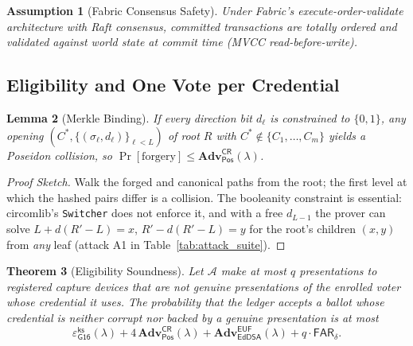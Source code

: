 \documentclass[10pt,letterpaper,journal]{IEEEtran}
\newtheorem{theorem}{Theorem}[section]
\newtheorem{lemma}[theorem]{Lemma}
\newtheorem{assumption}[theorem]{Assumption}
\begin{document}
\begin{assumption}[Fabric Consensus Safety]
\label{asm:fabric}
Under Fabric's execute-order-validate architecture with Raft consensus, committed transactions are totally ordered and validated against world state at commit time (MVCC read-before-write).
\end{assumption}

\subsection{Eligibility and One Vote per Credential}
\label{sec:eligibility}

\begin{lemma}[Merkle Binding]
\label{lem:merkle-binding}
If every direction bit $d_\ell$ is constrained to $\{0,1\}$, any opening $(C^\ast, \{(\sigma_\ell, d_\ell)\}_{\ell<L})$ of root $R$ with $C^\ast \notin \{C_1,\ldots,C_m\}$ yields a Poseidon collision, so $\Pr[\text{forgery}] \leq \mathbf{Adv}^{\mathsf{CR}}_{\mathsf{Pos}}(\lambda)$.
\end{lemma}

\begin{proof}[Proof Sketch]
Walk the forged and canonical paths from the root; the first level at which the hashed pairs differ is a collision. The booleanity constraint is essential: circomlib's \texttt{Switcher} does not enforce it, and with a free $d_{L-1}$ the prover can solve $L + d(R'-L) = x$, $R' - d(R'-L) = y$ for the root's children $(x,y)$ from \emph{any} leaf (attack A1 in Table~\ref{tab:attack_suite}).
\end{proof}

\begin{theorem}[Eligibility Soundness]
\label{thm:eligibility}
Let $\mathcal{A}$ make at most $q$ presentations to registered capture devices that are not genuine presentations of the enrolled voter whose credential it uses. The probability that the ledger accepts a ballot whose credential is neither corrupt nor backed by a genuine presentation is at most
\begin{equation}
\label{eq:eligibility-bound}
\varepsilon^{\mathsf{ks}}_{\mathsf{G16}}(\lambda) + 4\,\mathbf{Adv}^{\mathsf{CR}}_{\mathsf{Pos}}(\lambda) + \mathbf{Adv}^{\mathsf{EUF}}_{\mathsf{EdDSA}}(\lambda) + q \cdot \mathsf{FAR}_\delta .
\end{equation}
\end{theorem}
\end{document}
